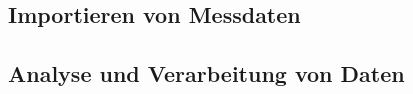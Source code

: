         \subsection{Importieren von Messdaten}
        \subsection{Analyse und Verarbeitung von Daten}
        